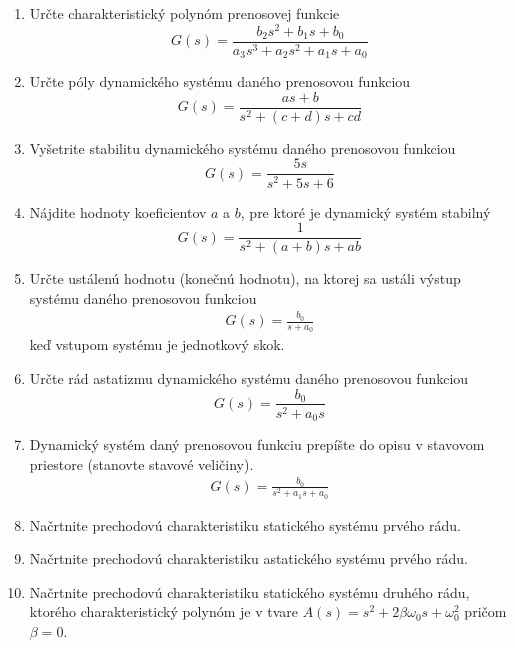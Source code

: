 \documentclass[a4paper, 10pt, ]{article}
\begin{document}
\begin{enumerate}[leftmargin=0pt, labelsep=3mm, itemsep=0pt]
    \item Určte charakteristický polynóm prenosovej funkcie
    \begin{equation*}
        G(s) = \frac{b_2 s^2 + b_1 s + b_0}{a_3 s^3 + a_2 s^2 + a_1 s + a_0}
    \end{equation*}


    \item Určte póly dynamického systému daného prenosovou funkciou
    \begin{equation*}
        G(s) = \frac{a s + b}{s^2 + (c+d) s + cd}
    \end{equation*}


    \item Vyšetrite stabilitu dynamického systému daného prenosovou funkciou
    \begin{equation*}
        G(s) = \frac{5 s }{s^2 + 5 s + 6}
    \end{equation*}

    \item Nájdite hodnoty koeficientov $a$ a $b$, pre ktoré je dynamický systém stabilný
    \begin{equation*}
        G(s) = \frac{1}{s^2 + (a+b) s + ab}
    \end{equation*}


    \item Určte ustálenú hodnotu (konečnú hodnotu), na ktorej sa ustáli výstup systému daného prenosovou funkciou
    \begin{align*}
        G(s) = \frac{b_0}{s + a_0}
    \end{align*}
    keď vstupom systému je jednotkový skok.


    \item Určte rád astatizmu dynamického systému daného prenosovou funkciou
    \begin{equation*}
        G(s) = \frac{b_0}{s^2 + a_0 s}
    \end{equation*}



    \item Dynamický systém daný prenosovou funkciu prepíšte do opisu v stavovom priestore (stanovte stavové veličiny).
    \begin{align*}
        G(s) = \frac{b_0}{s^2 + a_1 s + a_0}
    \end{align*}

    \item Načrtnite prechodovú charakteristiku statického systému prvého rádu.

    \item Načrtnite prechodovú charakteristiku astatického systému prvého rádu.

    \item Načrtnite prechodovú charakteristiku statického systému druhého rádu, ktorého charakteristický polynóm je v tvare $A(s) = s^2 + 2 \beta \omega_0 s + \omega_0^2$ pričom $\beta = 0$.



\end{enumerate}
\end{document}

